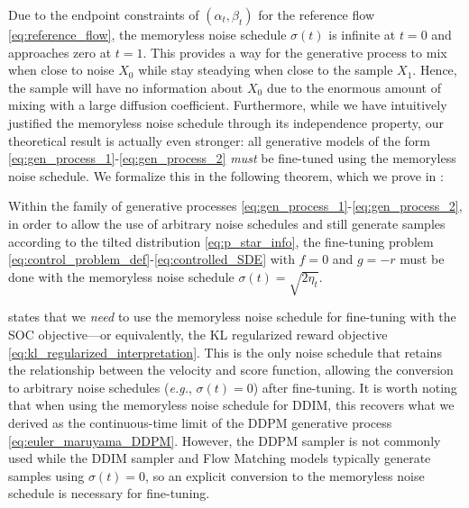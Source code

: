 \documentclass[]{fairmeta}
\makeatletter
\newcommand*{\eg}{{\it e.g.}\@\xspace}
\makeatother
\begin{document}
%
Due to the endpoint constraints of $(\alpha_t, \beta_t)$ for the reference flow \eqref{eq:reference_flow}, the memoryless noise schedule $\sigma(t)$ is infinite at $t=0$ and approaches zero at $t=1$. This provides a way for the generative process to mix when close to noise $X_0$ while stay steadying when close to the sample $X_1$. Hence, the sample will have no information about $X_0$ due to the enormous amount of mixing with a large diffusion coefficient.
Furthermore, while we have intuitively justified the memoryless noise schedule through its independence property, our theoretical result is actually even stronger: all generative models of the form \eqref{eq:gen_process_1}-\eqref{eq:gen_process_2} \textit{must} be fine-tuned using the memoryless noise schedule.
We formalize this in the following theorem, which we prove in :
\begin{theorem} \label{thm:general_fine-tuning}
Within the family of generative processes \eqref{eq:gen_process_1}-\eqref{eq:gen_process_2}, in order to allow the use of arbitrary noise schedules and still generate samples according to the tilted distribution \eqref{eq:p_star_info}, the fine-tuning problem \eqref{eq:control_problem_def}-\eqref{eq:controlled_SDE} with $f=0$ and $g=-r$ must be done with the memoryless noise schedule $\sigma(t) = \sqrt{2\eta_t}$.
\end{theorem}
 states that we \textit{need} to use the memoryless noise schedule for fine-tuning with the SOC objective---or equivalently, the KL regularized reward objective \eqref{eq:kl_regularized_interpretation}.
This is the only noise schedule that retains the relationship between the velocity and score function, allowing the conversion to arbitrary noise schedules (\eg, $\sigma(t) = 0$) after fine-tuning.
It is worth noting that when using the memoryless noise schedule for DDIM, this recovers what we derived as the continuous-time limit of the DDPM generative process \eqref{eq:euler_maruyama_DDPM}. However, the DDPM sampler \citep{ho2020denoising} is not commonly used while the DDIM sampler \citep{song2021denoising} and Flow Matching models typically generate samples using $\sigma(t) = 0$, so an explicit conversion to the memoryless noise schedule is necessary for fine-tuning. 
\end{document}
